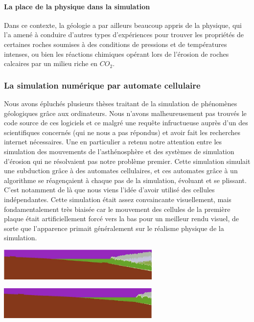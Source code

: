 \documentclass[a4paper,11pt]{article}
\begin{document}
\paragraph{La place de la physique dans la simulation}
\medbreak
Dans ce contexte, la géologie a par ailleurs beaucoup appris de la physique, qui l'a amené à conduire d'autres types d'expériences pour trouver les propriétés de certaines roches soumises à des conditions de pressions et de températures intenses, ou bien les réactions chimiques opérant lors de l'érosion de roches calcaires par un milieu riche en $CO_2$.

\subsubsection{La simulation numérique par automate cellulaire}

Nous avons épluchés plusieurs thèses traitant de la simulation de phénomènes géologiques grâce aux ordinateurs.
Nous n'avons malheureusement pas trouvés le code source de ces logiciels et ce malgré une requête infructueuse auprès d'un des scientifiques concernés (qui ne nous a pas répondus) et avoir fait les recherches internet nécessaires.
Une en particulier a retenu notre attention entre les simulation des mouvements de l’asthénosphère et des systèmes de simulation d'érosion qui ne résolvaient pas notre problème premier.
Cette simulation simulait une subduction grâce à des automates cellulaires, et ces automates grâce à un algorithme se réagençaient à chaque pas de la simulation, évoluant et se plissant.
C'est notamment de là que nous viens l'idée d'avoir utilisé des cellules indépendantes.
Cette simulation était assez convaincante visuellement, mais fondamentalement très biaisée car le mouvement des cellules de la première plaque était artificiellement forcé vers la bas pour un meilleur rendu visuel, de sorte que l'apparence primait généralement sur le réalisme physique de la simulation.

\begin{center}
  \includegraphics[width=8cm]{Images/3100_cell.png}
\end{center}
\begin{center}
  \includegraphics[width=8cm]{Images/7100_cell.png}
\end{center}
\end{document}
